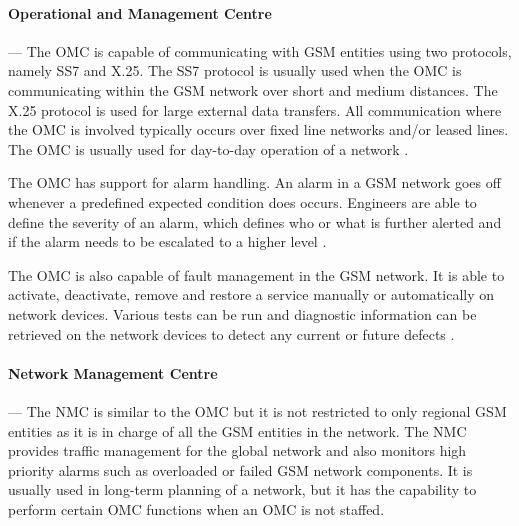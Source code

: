 \paragraph{Operational and Management Centre}
--- The OMC is capable of communicating with GSM entities using two protocols, namely SS7 and X.25. The SS7 protocol is usually used when the OMC is communicating within the GSM network over short and medium distances. The X.25 protocol is used for large external data transfers. All communication where the OMC is involved typically occurs over fixed line networks and/or leased lines. The OMC is usually used for day-to-day operation of a network \cite{GSMSysEngin}.

The OMC has support for alarm handling. An alarm in a GSM network goes off whenever a predefined expected condition does occurs. Engineers are able to define the severity of an alarm, which defines who or what is further alerted and if the alarm needs to be escalated to a higher level \cite{GSMSysEngin}.

The OMC is also capable of fault management in the GSM network. It is able to activate, deactivate, remove and restore a service manually or automatically on network devices\cite{GSM92}. Various tests can be run and diagnostic information can be retrieved on the network devices to detect any current or future defects \cite{GSMSysEngin}.

\paragraph{Network Management Centre}
--- The NMC is similar to the OMC but it is not restricted to only regional GSM entities as it is in charge of all the GSM entities in the network. The NMC provides traffic management for the global network and also monitors high priority alarms such as overloaded or failed GSM network components. It is usually used in long-term planning of a network, but it has the capability to perform certain OMC functions when an OMC is not staffed. 


